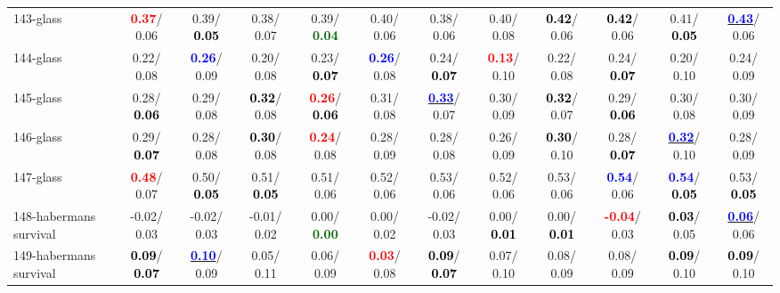 \begin{table}[h]
\begin{center}
{\begin{tabular}{lc|c|c|c|c|c|c|c|c|c|c}
143-glass & \textcolor{red}{\textbf{  0.37}}/  0.06 &   0.39/\textcolor{black}{\textbf{  0.05}} &   0.38/  0.07 &   0.39/\textcolor{darkgreen}{\textbf{  0.04}} &   0.40/  0.06 &   0.38/  0.06 &   0.40/  0.08 & \textcolor{black}{\textbf{  0.42}}/  0.06 & \textcolor{black}{\textbf{  0.42}}/  0.06 &   0.41/\textcolor{black}{\textbf{  0.05}} & \underline{\textcolor{blue}{\textbf{  0.43}}}/  0.06 \\
144-glass &   0.22/  0.08 & \textcolor{blue}{\textbf{  0.26}}/  0.09 &   0.20/  0.08 &   0.23/\textcolor{black}{\textbf{  0.07}} & \textcolor{blue}{\textbf{  0.26}}/  0.08 &   0.24/\textcolor{black}{\textbf{  0.07}} & \textcolor{red}{\textbf{  0.13}}/  0.10 &   0.22/  0.08 &   0.24/\textcolor{black}{\textbf{  0.07}} &   0.20/  0.10 &   0.24/  0.09 \\
145-glass &   0.28/\textcolor{black}{\textbf{  0.06}} &   0.29/  0.08 & \textcolor{black}{\textbf{  0.32}}/  0.08 & \textcolor{red}{\textbf{  0.26}}/\textcolor{black}{\textbf{  0.06}} &   0.31/  0.08 & \underline{\textcolor{blue}{\textbf{  0.33}}}/  0.07 &   0.30/  0.09 & \textcolor{black}{\textbf{  0.32}}/  0.07 &   0.29/\textcolor{black}{\textbf{  0.06}} &   0.30/  0.08 &   0.30/  0.09 \\
146-glass &   0.29/\textcolor{black}{\textbf{  0.07}} &   0.28/  0.08 & \textcolor{black}{\textbf{  0.30}}/  0.08 & \textcolor{red}{\textbf{  0.24}}/  0.08 &   0.28/  0.09 &   0.28/  0.08 &   0.26/  0.09 & \textcolor{black}{\textbf{  0.30}}/  0.10 &   0.28/\textcolor{black}{\textbf{  0.07}} & \underline{\textcolor{blue}{\textbf{  0.32}}}/  0.10 &   0.28/  0.09 \\
147-glass & \textcolor{red}{\textbf{  0.48}}/  0.07 &   0.50/\textcolor{black}{\textbf{  0.05}} &   0.51/\textcolor{black}{\textbf{  0.05}} &   0.51/  0.06 &   0.52/  0.06 &   0.53/  0.06 &   0.52/  0.06 &   0.53/  0.06 & \textcolor{blue}{\textbf{  0.54}}/  0.06 & \textcolor{blue}{\textbf{  0.54}}/\textcolor{black}{\textbf{  0.05}} &   0.53/\textcolor{black}{\textbf{  0.05}} \\
148-habermans survival &  -0.02/  0.03 &  -0.02/  0.03 &  -0.01/  0.02 &   0.00/\textcolor{darkgreen}{\textbf{  0.00}} &   0.00/  0.02 &  -0.02/  0.03 &   0.00/\textcolor{black}{\textbf{  0.01}} &   0.00/\textcolor{black}{\textbf{  0.01}} & \textcolor{red}{\textbf{ -0.04}}/  0.03 & \textcolor{black}{\textbf{  0.03}}/  0.05 & \underline{\textcolor{blue}{\textbf{  0.06}}}/  0.06 \\
149-habermans survival & \textcolor{black}{\textbf{  0.09}}/\textcolor{black}{\textbf{  0.07}} & \underline{\textcolor{blue}{\textbf{  0.10}}}/  0.09 &   0.05/  0.11 &   0.06/  0.09 & \textcolor{red}{\textbf{  0.03}}/  0.08 & \textcolor{black}{\textbf{  0.09}}/\textcolor{black}{\textbf{  0.07}} &   0.07/  0.10 &   0.08/  0.09 &   0.08/  0.09 & \textcolor{black}{\textbf{  0.09}}/  0.10 & \textcolor{black}{\textbf{  0.09}}/  0.10 \\ \hline

\end{tabular}}
\end{center}
\end{table}

